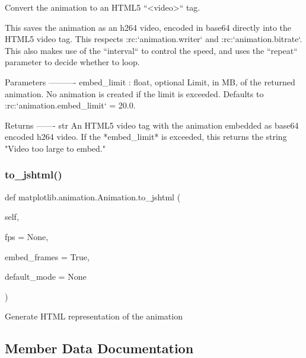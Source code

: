 \begin{DoxyVerb}Convert the animation to an HTML5 ``<video>`` tag.

This saves the animation as an h264 video, encoded in base64
directly into the HTML5 video tag. This respects :rc:`animation.writer`
and :rc:`animation.bitrate`. This also makes use of the
``interval`` to control the speed, and uses the ``repeat``
parameter to decide whether to loop.

Parameters
----------
embed_limit : float, optional
    Limit, in MB, of the returned animation. No animation is created
    if the limit is exceeded.
    Defaults to :rc:`animation.embed_limit` = 20.0.

Returns
-------
str
    An HTML5 video tag with the animation embedded as base64 encoded
    h264 video.
    If the *embed_limit* is exceeded, this returns the string
    "Video too large to embed."
\end{DoxyVerb}
 \mbox{\label{classmatplotlib_1_1animation_1_1Animation_a92a7136dc2e70f027d416bd0747851fb}} 
\subsubsection{\texorpdfstring{to\+\_\+jshtml()}{to\_jshtml()}}
{\footnotesize\ttfamily def matplotlib.\+animation.\+Animation.\+to\+\_\+jshtml (\begin{DoxyParamCaption}\item[{}]{self,  }\item[{}]{fps = {\ttfamily None},  }\item[{}]{embed\+\_\+frames = {\ttfamily True},  }\item[{}]{default\+\_\+mode = {\ttfamily None} }\end{DoxyParamCaption})}

\begin{DoxyVerb}Generate HTML representation of the animation\end{DoxyVerb}
 

\subsection{Member Data Documentation}
\mbox{\label{classmatplotlib_1_1animation_1_1Animation_a7c178d14af9c70d7dc3de5dc78b7a70a}} 
